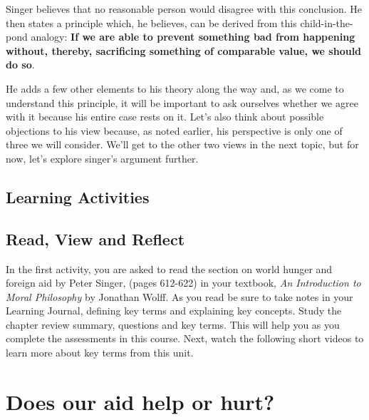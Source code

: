 \documentclass[
]{book}
\begin{document}
Singer believes that no reasonable person would disagree with this conclusion. He then states a principle which, he believes, can be derived from this child-in-the-pond analogy: \textbf{If we are able to prevent something bad from happening without, thereby, sacrificing something of comparable value, we should do so}.

He adds a few other elements to his theory along the way and, as we come to understand this principle, it will be important to ask ourselves whether we agree with it because his entire case rests on it. Let's also think about possible objections to his view because, as noted earlier, his perspective is only one of three we will consider. We'll get to the other two views in the next topic, but for now, let's explore singer's argument further.

\hypertarget{learning-activities-23}{%
\subsection*{Learning Activities}\label{learning-activities-23}}

\begin{reflect}
\hypertarget{read-view-and-reflect-32}{%
\subsection*{Read, View and Reflect}\label{read-view-and-reflect-32}}

In the first activity, you are asked to read the section on world hunger and foreign aid by Peter Singer, (pages 612-622) in your textbook, \emph{An Introduction to Moral Philosophy} by Jonathan Wolff. As you read be sure to take notes in your Learning Journal, defining key terms and explaining key concepts. Study the chapter review summary, questions and key terms. This will help you as you complete the assessments in this course.
Next, watch the following short videos to learn more about key terms from this unit.
\end{reflect}

\hypertarget{does-our-aid-help-or-hurt}{%
\section*{Does our aid help or hurt?}\label{does-our-aid-help-or-hurt}}
\end{document}
